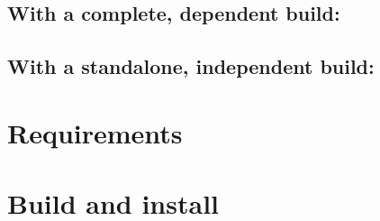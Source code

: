 \documentclass[letterpaper,10pt,english]{sphinxmanual}
\begin{document}
\subsection{With a complete,  dependent  build:}
\label{\detokenize{IntroAndInstall/install:with-a-complete-geant4-dependent-g4hepem-build}}
\begin{sphinxVerbatim}[commandchars=\\\{\}]
    
\end{sphinxVerbatim}


\subsection{With a standalone,  independent  build:}
\label{\detokenize{IntroAndInstall/install:with-a-standalone-geant4-independent-g4hepem-build}}
\begin{sphinxVerbatim}[commandchars=\\\{\}]
   
\end{sphinxVerbatim}


\section{Requirements}
\label{\detokenize{IntroAndInstall/install:requirements}}\label{\detokenize{IntroAndInstall/install:install-requirements}}

\section{Build and install}
\label{\detokenize{IntroAndInstall/install:id1}}
\sphinxstepscope
\end{document}
